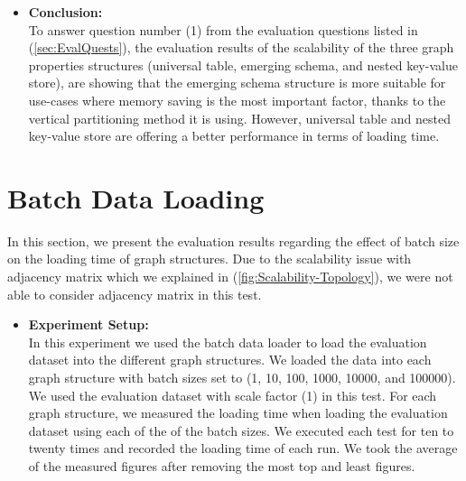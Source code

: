 {\begin{itemize}
In regard to the memory footprint, nested key-value store has recorded the largest memory footprint among all the three graph topology structures due to the memory that is used to store the properties names in each and every row in addition to the properties values. The emerging schema structure has benefited form the vertical partitioning of the data into a set of column groups to record less memory footprint than that of universal table. The vertical partitioning used in emerging schema is reducing the memory consumption by eliminating most of the null values and not storing them.

\item \textbf{Conclusion:}\\
To answer question number (1) from the evaluation questions listed in (\ref{sec:EvalQuests}), the evaluation results of the scalability of the three graph properties structures (universal table, emerging schema, and nested key-value store), are showing that the emerging schema structure is more suitable for use-cases where memory saving is the most important factor, thanks to the vertical partitioning method it is using. However, universal table and nested key-value store are offering a better performance in terms of loading time.

\end{itemize}



\section{Batch Data Loading}
\label{sec:eval-batchLoading}

In this section, we present the evaluation results regarding the effect of batch size on the loading time of graph structures. Due to the scalability issue with adjacency matrix which we explained in (\ref{fig:Scalability-Topology}), we were not able to consider adjacency matrix in this test.

\begin{itemize}  

\item \textbf{Experiment Setup:}\\
In this experiment we used the batch data loader to load the evaluation dataset into the different graph structures. We loaded the data into each graph structure with batch sizes set to (1, 10, 100, 1000, 10000, and 100000). We used the evaluation dataset with scale factor (1) in this test. For each graph structure, we measured the loading time when loading the evaluation dataset using each of the of the batch sizes. We executed each test for ten to twenty times and recorded the loading time of each run. We took the average of the measured figures after removing the most top and least figures.



\end{itemize}}
